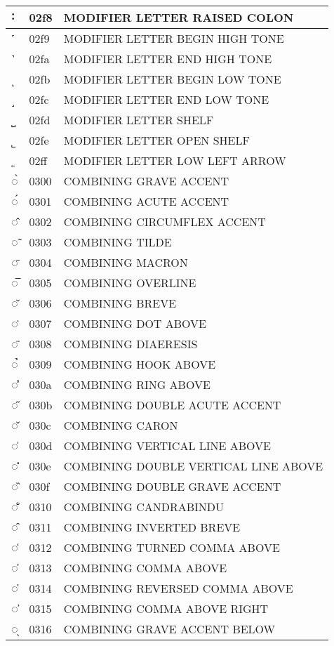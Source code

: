 \documentclass[12pt,letterpaper,openany]{book}
\begin{document}
\begin{center}
\begin{supertabular}{|m{0.25in}|m{0.5in}|m{4in}|}
˸ & 02f8 & MODIFIER LETTER RAISED COLON\\\hline
˹ & 02f9 & MODIFIER LETTER BEGIN HIGH TONE\\\hline
˺ & 02fa & MODIFIER LETTER END HIGH TONE\\\hline
˻ & 02fb & MODIFIER LETTER BEGIN LOW TONE\\\hline
˼ & 02fc & MODIFIER LETTER END LOW TONE\\\hline
˽ & 02fd & MODIFIER LETTER SHELF\\\hline
˾ & 02fe & MODIFIER LETTER OPEN SHELF\\\hline
˿ & 02ff & MODIFIER LETTER LOW LEFT ARROW\\\hline
◌̀ & 0300 & COMBINING GRAVE ACCENT\\\hline
◌́ & 0301 & COMBINING ACUTE ACCENT\\\hline
◌̂ & 0302 & COMBINING CIRCUMFLEX ACCENT\\\hline
◌̃ & 0303 & COMBINING TILDE\\\hline
◌̄ & 0304 & COMBINING MACRON\\\hline
◌̅ & 0305 & COMBINING OVERLINE\\\hline
◌̆ & 0306 & COMBINING BREVE\\\hline
◌̇ & 0307 & COMBINING DOT ABOVE\\\hline
◌̈ & 0308 & COMBINING DIAERESIS\\\hline
◌̉ & 0309 & COMBINING HOOK ABOVE\\\hline
◌̊ & 030a & COMBINING RING ABOVE\\\hline
◌̋ & 030b & COMBINING DOUBLE ACUTE ACCENT\\\hline
◌̌ & 030c & COMBINING CARON\\\hline
◌̍ & 030d & COMBINING VERTICAL LINE ABOVE\\\hline
◌̎ & 030e & COMBINING DOUBLE VERTICAL LINE ABOVE\\\hline
◌̏ & 030f & COMBINING DOUBLE GRAVE ACCENT\\\hline
◌̐ & 0310 & COMBINING CANDRABINDU\\\hline
◌̑ & 0311 & COMBINING INVERTED BREVE\\\hline
◌̒ & 0312 & COMBINING TURNED COMMA ABOVE\\\hline
◌̓ & 0313 & COMBINING COMMA ABOVE\\\hline
◌̔ & 0314 & COMBINING REVERSED COMMA ABOVE\\\hline
◌̕ & 0315 & COMBINING COMMA ABOVE RIGHT\\\hline
◌̖ & 0316 & COMBINING GRAVE ACCENT BELOW\\\hline

\end{supertabular}
\end{center}
\end{document}
